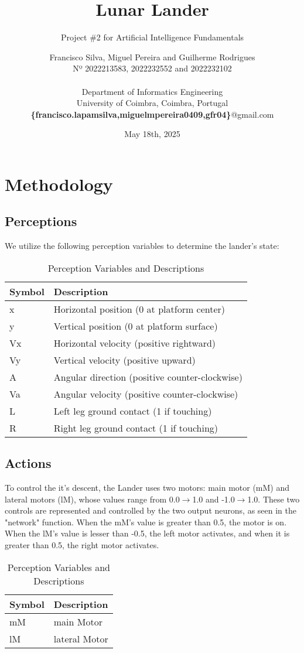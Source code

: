 \documentclass{article}
\title{\textbf{Lunar Lander}}
\subtitle{Project \#2 for Artificial Intelligence Fundamentals}
\author{Francisco Silva, Miguel Pereira and Guilherme Rodrigues 
\\ Nº 2022213583, 2022232552 and 2022232102 \\ \\
Department of Informatics Engineering \\
University of Coimbra, Coimbra, Portugal
\\ \textbf{\{francisco.lapamsilva,miguelmpereira0409,gfr04\}}@gmail.com}
\date{May 18th, 2025}
\begin{document}
\maketitle

\newpage
\tableofcontents
\newpage

\section{Methodology}
\subsection{Perceptions}
We utilize the following perception variables to determine the lander's state:

\begin{table}[h]
\centering
\begin{tabular}{@{}ll@{}}
\toprule
\textbf{Symbol} & \textbf{Description} \\
\midrule
x & Horizontal position (0 at platform center) \\
y & Vertical position (0 at platform surface) \\
Vx & Horizontal velocity (positive rightward) \\
Vy & Vertical velocity (positive upward) \\
A & Angular direction (positive counter-clockwise) \\
Va & Angular velocity (positive counter-clockwise) \\
L & Left leg ground contact (1 if touching) \\
R & Right leg ground contact (1 if touching) \\
\bottomrule
\end{tabular}
\caption{Perception Variables and Descriptions}
\end{table}

\subsection{Actions}
To control the it's descent, the Lander uses two motors: main motor (mM) and lateral motors (lM), whose values range from 0.0$\rightarrow$1.0 and -1.0$\rightarrow$1.0.
These two controls are represented and controlled by the two output neurons, as seen in the "network" function.
When the mM's value is greater than 0.5, the motor is on. When the lM's value is lesser than -0.5, the left motor activates, and when it is greater than 0.5, the right motor activates.
\begin{table}[h]
\centering
\begin{tabular}{@{}ll@{}}
\toprule
\textbf{Symbol} & \textbf{Description} \\
\midrule
mM & main Motor \\
lM & lateral Motor \\
\bottomrule
\end{tabular}
\caption{Perception Variables and Descriptions}
\end{table}
\end{document}
